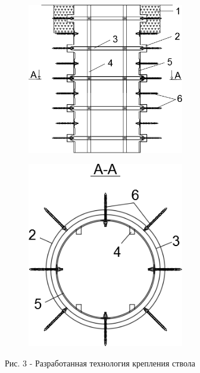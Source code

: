 \begin{figure}[H]
    \centering
    \begin{subfigure}[b]{0.45\textwidth}
        \centering
        \includegraphics[width=0.75\textwidth]{assets/1131}
    \end{subfigure}
    \hfill
    \begin{subfigure}[b]{0.4\textwidth}
        \centering
        \includegraphics[width=0.75\textwidth]{assets/1132}
    \end{subfigure}
    \caption*{Рис. 3 - Разработанная технология крепления ствола}
\end{figure}

